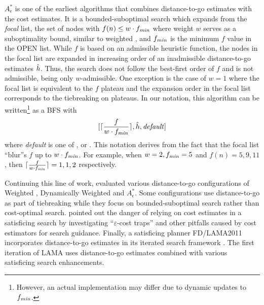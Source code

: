 $A^*_\epsilon$ \cite{pearl1982studies} is one of
the earliest algorithms that combines distance-to-go estimates with the cost estimates. It is a bounded-suboptimal
search which expands from the \emph{focal} list, the set of nodes with $f(n)\leq w\cdot f_{\mit{min}}$ where weight $w$ serves as a suboptimality bound, similar to weighted \astar, 
 and $f_{\mit{min}}$ is the minimum $f$ value in the OPEN list.  While $f$
is based on an admissible heuristic function, the nodes in the focal list are expanded in increasing order of
an inadmissible distance-to-go estimates $\hh$. Thus, the search does not follow the best-first order of $f$ and is
not admissible, being only $w$-admissible. One exception is the case of $w=1$ where the focal list is equivalent
to the $f$ plateau and the expansion order in the focal list corresponds to the tiebreaking on plateaus. In our
notation, this algorithm can be written\footnote{
However, an actual implementation may differ due to dynamic updates to $f_{\mit{min}}$.}
as a BFS with
\[
 [ \lceil \frac{f}{w\cdot f_{\mit{min}}} \rceil, \hh, \mit{default}]
\]
where \textit{default} is one of \fifo, \lifo or \ro.
This notation derives from the fact that the focal list ``blur''s $f$ up to $w\cdot f_{\mit{min}}$.
For example, when $w=2, f_{\mit{min}}=5$ and
$f(n)=5,9,11$, then $\lceil \frac{f}{w\cdot f_{\mit{min}}} \rceil=1,1,2$ respectively. 

Continuing this line of work,  \citeyear{thayer2009using,thayer2011bounded}
evaluated various distance-to-go configurations of Weighted
\astar, Dynamically Weighted \astar \cite{pohl1973avoidance} and $A^*_\epsilon$.
Some configurations use distance-to-go as part of
tiebreaking while they focus on bounded-suboptimal search rather than cost-optimal search.
% 
 \citeyear{cushing2010cost} pointed out the danger of relying  %
on cost estimates in a satisficing search by investigating ``$\varepsilon$-cost traps'' and other pitfalls caused by
cost estimators for search guidance. %
% 
Finally, a \sota satisficing planner FD/LAMA2011 incorporates distance-to-go estimates in its iterated search
framework \cite{richter2011lama}. The first iteration of LAMA uses distance-to-go estimates combined with various satisficing
search enhancements.

